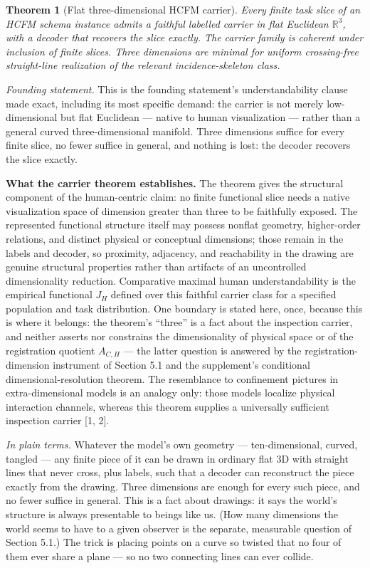 \documentclass[11pt]{article}
\newtheorem{theorem}{Theorem}
\theoremstyle{definition}
\newcommand{\plainterms}{\emph{In plain terms.}}
\newcommand{\founding}{\emph{Founding statement.}}
\begin{document}
\begin{theorem}[Flat three-dimensional HCFM carrier]
\label{thm:flat-3d-carrier}
Every finite task slice of an HCFM schema instance admits a faithful labelled carrier in flat Euclidean $\mathbb{R}^3$, with a decoder that recovers the slice exactly. The carrier family is coherent under inclusion of finite slices. Three dimensions are minimal for uniform crossing-free straight-line realization of the relevant incidence-skeleton class.
\end{theorem}

\noindent\founding{} This is the founding statement's understandability clause made exact, including its most specific demand: the carrier is not merely low-dimensional but flat Euclidean --- native to human visualization --- rather than a general curved three-dimensional manifold. Three dimensions suffice for every finite slice, no fewer suffice in general, and nothing is lost: the decoder recovers the slice exactly.

\noindent\textbf{What the carrier theorem establishes.} The theorem gives the structural component of the human-centric claim: no finite functional slice needs a native visualization space of dimension greater than three to be faithfully exposed. The represented functional structure itself may possess nonflat geometry, higher-order relations, and distinct physical or conceptual dimensions; those remain in the labels and decoder, so proximity, adjacency, and reachability in the drawing are genuine structural properties rather than artifacts of an uncontrolled dimensionality reduction. Comparative maximal human understandability is the empirical functional $J_H$ defined over this faithful carrier class for a specified population and task distribution. One boundary is stated here, once, because this is where it belongs: the theorem's ``three'' is a fact about the inspection carrier, and neither asserts nor constrains the dimensionality of physical space or of the registration quotient $A_{C,H}$ --- the latter question is answered by the registration-dimension instrument of Section 5.1 and the supplement's conditional dimensional-resolution theorem. The resemblance to confinement pictures in extra-dimensional models is an analogy only: those models localize physical interaction channels, whereas this theorem supplies a universally sufficient inspection carrier [1, 2].

\noindent\plainterms{} Whatever the model's own geometry --- ten-dimensional, curved, tangled --- any finite piece of it can be drawn in ordinary flat 3D with straight lines that never cross, plus labels, such that a decoder can reconstruct the piece exactly from the drawing. Three dimensions are enough for every such piece, and no fewer suffice in general. This is a fact about drawings: it says the world's structure is always presentable to beings like us. (How many dimensions the world seems to have to a given observer is the separate, measurable question of Section 5.1.) The trick is placing points on a curve so twisted that no four of them ever share a plane --- so no two connecting lines can ever collide.
\end{document}
